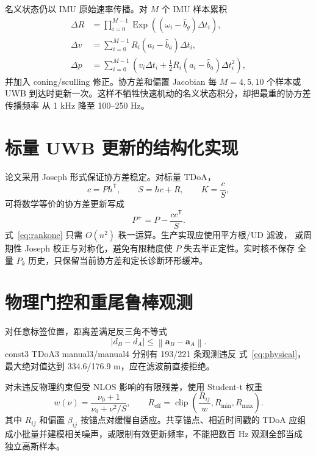 \documentclass[11pt,a4paper]{ctexart}
\begin{document}
名义状态仍以 IMU 原始速率传播。对 $M$ 个 IMU 样本累积
\begin{align}
\Delta R&=\prod_{i=0}^{M-1}
\operatorname{Exp}\!\left((\omega_i-\hat b_g)\Delta t_i\right),\\
\Delta v&=\sum_{i=0}^{M-1}
R_i(a_i-\hat b_a)\Delta t_i,\\
\Delta p&=\sum_{i=0}^{M-1}
\left(v_i\Delta t_i+
\frac12R_i(a_i-\hat b_a)\Delta t_i^2\right),
\end{align}
并加入 coning/sculling 修正。协方差和偏置 Jacobian 每 $M=4,5,10$ 个样本或
UWB 到达时更新一次。这样不牺牲快速机动的名义状态积分，却把最重的协方差传播频率
从 1 kHz 降至 100--250 Hz。

\section{标量 UWB 更新的结构化实现}

论文采用 Joseph 形式保证协方差稳定。对标量 TDoA，
\begin{equation}
c=Ph^{\mathsf T},\qquad
S=hc+R,\qquad
K=\frac{c}{S},
\end{equation}
可将数学等价的协方差更新写成
\begin{equation}
P^+=P-\frac{cc^{\mathsf T}}{S}.
\label{eq:rankone}
\end{equation}
式~\eqref{eq:rankone} 只需 $O(n^2)$ 秩一运算。生产实现应使用平方根/UD 滤波，
或周期性 Joseph 校正与对称化，避免有限精度使 $P$ 失去半正定性。实时核不保存
全量 $P_k$ 历史，只保留当前协方差和定长诊断环形缓冲。

\section{物理门控和重尾鲁棒观测}

对任意标签位置，距离差满足反三角不等式
\begin{equation}
\left|d_B-d_A\right|
\leq \left\|\bm a_B-\bm a_A\right\|.
\label{eq:physical}
\end{equation}
const3 TDoA3 manual3/manual4 分别有 193/221 条观测违反
式~\eqref{eq:physical}，最大绝对值达到 334.6/176.9 m，应在滤波前直接拒绝。

对未违反物理约束但受 NLOS 影响的有限残差，使用 Student-t 权重
\begin{equation}
w(\nu)=\frac{\nu_0+1}{\nu_0+\nu^2/S},
\qquad
R_{\mathrm{eff}}=\operatorname{clip}
\left(\frac{R_{ij}}{w},R_{\min},R_{\max}\right).
\label{eq:student}
\end{equation}
其中 $R_{ij}$ 和偏置 $\beta_{ij}$ 按锚点对缓慢自适应。共享锚点、相近时间戳的
TDoA 应组成小批量并建模相关噪声，或限制有效更新频率，不能把数百 Hz 观测全部当成
独立高斯样本。
\end{document}

